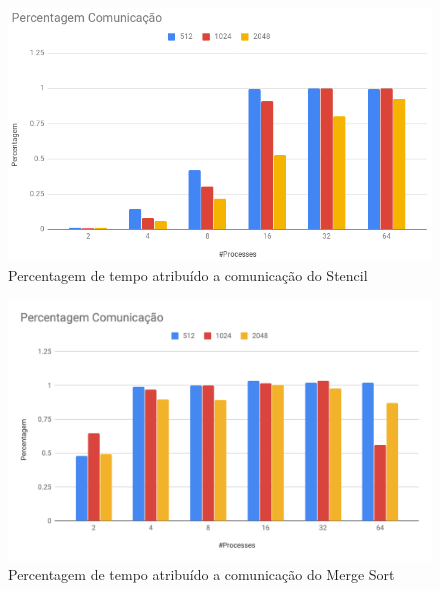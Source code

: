 \documentclass{article}
\begin{document}
\begin{appendix}
\begin{figure}[H]
    \centering
    \includegraphics[width=17cm]{Pictures/comm_temp1.png}
    \caption{Percentagem de tempo atribuído a comunicação do Stencil}
    \label{tempStencil}
\end{figure}

\begin{figure}[H]
    \centering
    \includegraphics[width=17cm]{Pictures/comm_temp2.png}
    \caption{Percentagem de tempo atribuído a comunicação do Merge Sort}
    \label{tempMergeSort}
\end{figure}


\end{appendix}
\end{document}
